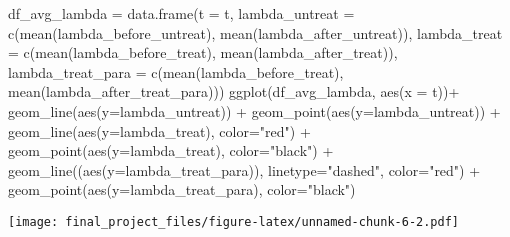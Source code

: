 \documentclass[
]{article}
\newenvironment{Shaded}{\begin{snugshade}}{\end{snugshade}}
\newcommand{\AttributeTok}[1]{\textcolor[rgb]{0.77,0.63,0.00}{#1}}
\newcommand{\FunctionTok}[1]{\textcolor[rgb]{0.00,0.00,0.00}{#1}}
\newcommand{\NormalTok}[1]{#1}
\newcommand{\OtherTok}[1]{\textcolor[rgb]{0.56,0.35,0.01}{#1}}
\newcommand{\SpecialCharTok}[1]{\textcolor[rgb]{0.00,0.00,0.00}{#1}}
\newcommand{\StringTok}[1]{\textcolor[rgb]{0.31,0.60,0.02}{#1}}
\begin{document}
\begin{Shaded}
\begin{Highlighting}[]
\NormalTok{df\_avg\_lambda }\OtherTok{=} \FunctionTok{data.frame}\NormalTok{(}\AttributeTok{t =}\NormalTok{ t,}
                          \AttributeTok{lambda\_untreat =} \FunctionTok{c}\NormalTok{(}\FunctionTok{mean}\NormalTok{(lambda\_before\_untreat), }\FunctionTok{mean}\NormalTok{(lambda\_after\_untreat)), }
                          \AttributeTok{lambda\_treat =} \FunctionTok{c}\NormalTok{(}\FunctionTok{mean}\NormalTok{(lambda\_before\_treat), }\FunctionTok{mean}\NormalTok{(lambda\_after\_treat)),}
                          \AttributeTok{lambda\_treat\_para =} \FunctionTok{c}\NormalTok{(}\FunctionTok{mean}\NormalTok{(lambda\_before\_treat), }\FunctionTok{mean}\NormalTok{(lambda\_after\_treat\_para)))}
\FunctionTok{ggplot}\NormalTok{(df\_avg\_lambda, }\FunctionTok{aes}\NormalTok{(}\AttributeTok{x =}\NormalTok{ t))}\SpecialCharTok{+}
  \FunctionTok{geom\_line}\NormalTok{(}\FunctionTok{aes}\NormalTok{(}\AttributeTok{y=}\NormalTok{lambda\_untreat)) }\SpecialCharTok{+} 
  \FunctionTok{geom\_point}\NormalTok{(}\FunctionTok{aes}\NormalTok{(}\AttributeTok{y=}\NormalTok{lambda\_untreat)) }\SpecialCharTok{+}
  \FunctionTok{geom\_line}\NormalTok{(}\FunctionTok{aes}\NormalTok{(}\AttributeTok{y=}\NormalTok{lambda\_treat), }\AttributeTok{color=}\StringTok{"red"}\NormalTok{) }\SpecialCharTok{+} 
  \FunctionTok{geom\_point}\NormalTok{(}\FunctionTok{aes}\NormalTok{(}\AttributeTok{y=}\NormalTok{lambda\_treat), }\AttributeTok{color=}\StringTok{"black"}\NormalTok{) }\SpecialCharTok{+} 
  \FunctionTok{geom\_line}\NormalTok{((}\FunctionTok{aes}\NormalTok{(}\AttributeTok{y=}\NormalTok{lambda\_treat\_para)), }\AttributeTok{linetype=}\StringTok{"dashed"}\NormalTok{, }\AttributeTok{color=}\StringTok{"red"}\NormalTok{) }\SpecialCharTok{+}
  \FunctionTok{geom\_point}\NormalTok{(}\FunctionTok{aes}\NormalTok{(}\AttributeTok{y=}\NormalTok{lambda\_treat\_para), }\AttributeTok{color=}\StringTok{"black"}\NormalTok{)}
\end{Highlighting}
\end{Shaded}

\texttt{[image: final\_project\_files/figure-latex/unnamed-chunk-6-2.pdf]}
\end{document}
